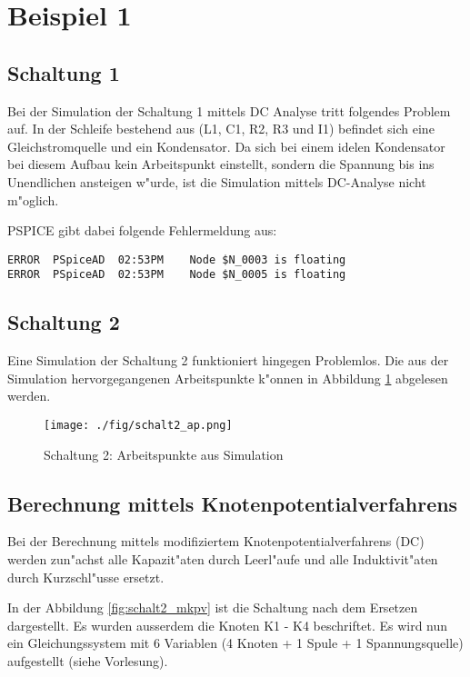 

\section{Beispiel 1}

\subsection{Schaltung 1}

Bei der Simulation der Schaltung 1 mittels DC Analyse tritt folgendes Problem auf. In der 
Schleife bestehend aus (L1, C1, R2, R3 und I1) befindet sich eine Gleichstromquelle und ein Kondensator.
Da sich bei einem idelen Kondensator bei diesem Aufbau kein Arbeitspunkt einstellt, sondern die Spannung
bis ins Unendlichen ansteigen w"urde, ist die Simulation mittels DC-Analyse nicht m"oglich.

PSPICE gibt dabei folgende Fehlermeldung aus:

\begin{verbatim}
ERROR  PSpiceAD  02:53PM    Node $N_0003 is floating
ERROR  PSpiceAD  02:53PM    Node $N_0005 is floating
\end{verbatim}


\subsection{Schaltung 2}

Eine Simulation der Schaltung 2 funktioniert hingegen Problemlos. Die aus der Simulation hervorgegangenen
Arbeitspunkte k"onnen in Abbildung \ref{fig:schalt2_ap} abgelesen werden.


\begin{figure}[h!]
 \centering
 \texttt{[image: ./fig/schalt2\_ap.png]}
 \caption{Schaltung 2: Arbeitspunkte aus Simulation}
 \label{fig:schalt2_ap}
\end{figure}


\subsection{Berechnung mittels Knotenpotentialverfahrens}

Bei der Berechnung mittels modifiziertem Knotenpotentialverfahrens (DC) werden zun"achst alle
Kapazit"aten durch Leerl"aufe und alle Induktivit"aten durch Kurzschl"usse ersetzt.

In der Abbildung \ref{fig:schalt2_mkpv} ist die Schaltung nach dem Ersetzen dargestellt.
Es wurden ausserdem die Knoten K1 - K4 beschriftet. Es wird nun ein Gleichungssystem mit 6 Variablen
(4 Knoten + 1 Spule + 1 Spannungsquelle) aufgestellt (siehe Vorlesung).

